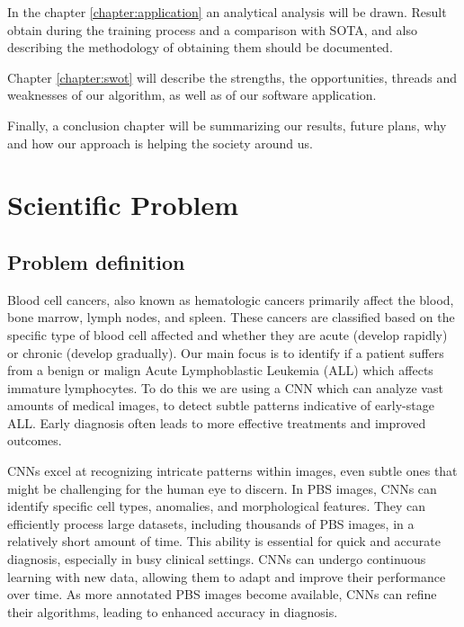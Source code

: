 \documentclass[runningheads,a4paper,11pt]{report}
\begin{document}
In the chapter \ref{chapter:application} an analytical analysis will be drawn. Result obtain during the training process and a comparison with SOTA, and also describing the methodology of obtaining them should be documented.

Chapter \ref{chapter:swot} will describe the strengths, the opportunities, threads and weaknesses of our algorithm, as well as of our software application.

Finally, a conclusion chapter will be summarizing our results, future plans, why and how our approach is helping the society around us.



\chapter{Scientific Problem}
\label{section:scientificProblem}


\section{Problem definition}
\label{section:problemDefinition}

Blood cell cancers, also known as hematologic cancers primarily affect the blood, bone marrow, lymph nodes, and spleen. These cancers are classified based on the specific type of blood cell affected and whether they are acute (develop rapidly) or chronic (develop gradually). Our main focus is to identify if a patient suffers from a benign or malign  Acute Lymphoblastic Leukemia (ALL) which affects immature lymphocytes. To do this we are using a CNN which  can analyze vast amounts of medical images, to detect subtle patterns indicative of early-stage ALL. Early diagnosis often leads to more effective treatments and improved outcomes. 

CNNs excel at recognizing intricate patterns within images, even subtle ones that might be challenging for the human eye to discern. In PBS images, CNNs can identify specific cell types, anomalies, and morphological features. They can efficiently process large datasets, including thousands of PBS images, in a relatively short amount of time. This ability is essential for quick and accurate diagnosis, especially in busy clinical settings. CNNs can undergo continuous learning with new data, allowing them to adapt and improve their performance over time. As more annotated PBS images become available, CNNs can refine their algorithms, leading to enhanced accuracy in diagnosis.
\end{document}
